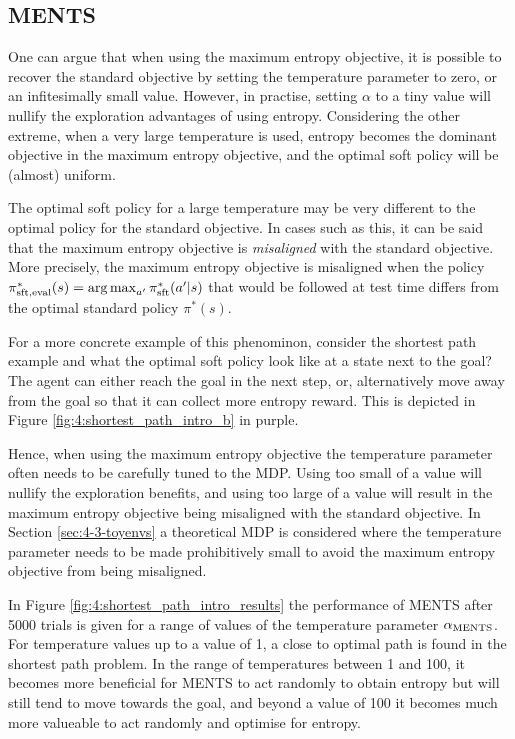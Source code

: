     \subsection{MENTS}

        One can argue that when using the maximum entropy objective, it is possible to recover the standard objective by setting the temperature parameter to zero, or an infitesimally small value. However, in practise, setting $\alpha$ to a tiny value will nullify the exploration advantages of using entropy. Considering the other extreme, when a very large temperature is used, entropy becomes the dominant objective in the maximum entropy objective, and the optimal soft policy will be (almost) uniform. 

        The optimal soft policy for a large temperature may be very different to the optimal policy for the standard objective. In cases such as this, it can be said that the maximum entropy objective is \textit{misaligned} with the standard objective. More precisely, the maximum entropy objective is misaligned when the policy $\pi^*_{{\textnormal{sft}},\text{eval}}(s) = \operatorname*{arg\,max}_{a'} \pi^*_{{\textnormal{sft}}}(a'|s)$ that would be followed at test time differs from the optimal standard policy $\pi^*(s)$.
        
        For a more concrete example of this phenominon, consider the shortest path example and what the optimal soft policy look like at a state next to the goal? The agent can either reach the goal in the next step, or, alternatively move away from the goal so that it can collect more entropy reward. This is depicted in Figure \ref{fig:4:shortest_path_intro_b} in purple.   

        Hence, when using the maximum entropy objective the temperature parameter often needs to be carefully tuned to the MDP. Using too small of a value will nullify the exploration benefits, and using too large of a value will result in the maximum entropy objective being misaligned with the standard objective. In Section \ref{sec:4-3-toyenvs} a theoretical MDP is considered where the temperature parameter needs to be made prohibitively small to avoid the maximum entropy objective from being misaligned. 

        In Figure \ref{fig:4:shortest_path_intro_results} the performance of MENTS after 5000 trials is given for a range of values of the temperature parameter ${\alpha_{{\textnormal{MENTS}}}}$. For temperature values up to a value of 1, a close to optimal path is found in the shortest path problem. In the range of temperatures between 1 and 100, it becomes more beneficial for MENTS to act randomly to obtain entropy but will still tend to move towards the goal, and beyond a value of 100 it becomes much more valueable to act randomly and optimise for entropy. 

